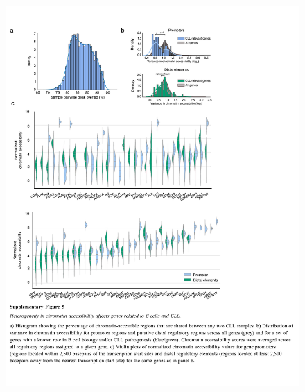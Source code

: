 \documentclass[10pt,]{article}
\begin{document}
\begin{figure}
\centering
\includegraphics[width=1.000\hsize]{figures/Supplementary_Information_05.pdf}
\end{figure}
\clearpage
\end{document}
